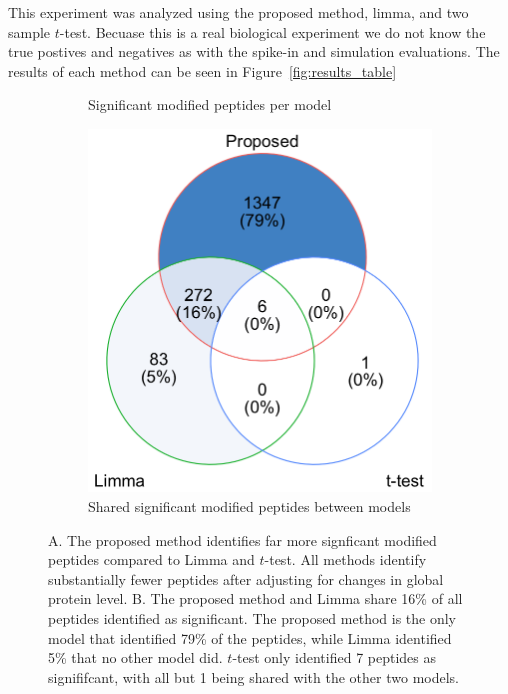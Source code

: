 \documentclass{mcp}
\def\sfigref#1{{Figure~\ref{#1}}}
\begin{document}
This experiment was analyzed using the proposed method, limma, and two sample $t$-test. Becuase this is a real biological experiment we do not know the true postives and negatives as with the spike-in and simulation evaluations. The results of each method can be seen in \sfigref{fig:results_table}

\begin{figure}[!ht]
\begin{subfigure}[b]{1\linewidth}
\centering
{}
\caption{Significant modified peptides per model}
\label{fig:results_table1a}
\end{subfigure}
 \vspace{1cm}
\begin{subfigure}[b]{1\linewidth}
\centering
\includegraphics[width=.6\textwidth]{sim_new/usp30_ven}
\caption{Shared significant modified peptides between models}
\label{fig:results_table1b}
\end{subfigure}
\caption{A. The proposed method identifies far more signficant modified peptides compared to Limma and $t$-test. All methods identify substantially fewer peptides after adjusting for changes in global protein level. B. The proposed method and Limma share 16\% of all peptides identified as significant. The proposed method is the only model that identified 79\% of the peptides, while Limma identified 5\% that no other model did. $t$-test only identified 7 peptides as signififcant, with all but 1 being shared with the other two models.}
\label{fig:1asdfa}
\end{figure}
\end{document}
